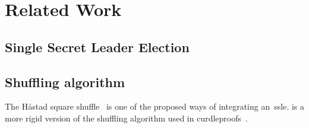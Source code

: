 \section{Related Work}\label{sec:related-work}




\subsection{Single Secret Leader Election}\label{sec:related-work-SSLE}




\subsection{Shuffling algorithm}\label{sec:related-work-Shuffling-algorithm}

The Håstad square shuffle~\cite{haastad2006square} is one of the proposed ways of integrating an~\gls{ssle}.
is a more rigid version of the shuffling algorithm used in curdleproofs~\cite{cryptoeprint:2022/560}.




%
%

